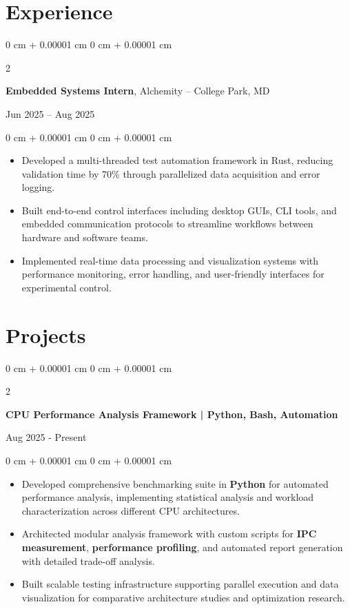 \documentclass[10pt, letterpaper]{article}
\newenvironment{highlights}{
    \begin{itemize}[
        topsep=0.05 cm,
        parsep=0.05 cm,
        partopsep=0pt,
        itemsep=0pt,
        leftmargin=0 cm + 10pt
    ]
}{
    \end{itemize}
}
\newenvironment{onecolentry}{
    \begin{adjustwidth}{
        0 cm + 0.00001 cm
    }{
        0 cm + 0.00001 cm
    }
}{
    \end{adjustwidth}
}
\newenvironment{twocolentry}[2][]{
    \onecolentry
    \def\secondColumn{#2}
    \setcolumnwidth{\fill, 4.5 cm}
    \begin{paracol}{2}
}{
    \switchcolumn \raggedleft \secondColumn
    \end{paracol}
    \endonecolentry
}
\begin{document}
    \section{Experience}

        \begin{twocolentry}{
            Jun 2025 – Aug 2025
        }
            \textbf{Embedded Systems Intern}, Alchemity -- College Park, MD
        \end{twocolentry}
        \vspace{0.05 cm}
        \begin{onecolentry}
            \begin{highlights}
                \item Developed a multi-threaded test automation framework in Rust, reducing validation time by 70\% through parallelized data acquisition and error logging.
                \item Built end-to-end control interfaces including desktop GUIs, CLI tools, and embedded communication protocols to streamline workflows between hardware and software teams.
                \item Implemented real-time data processing and visualization systems with performance monitoring, error handling, and user-friendly interfaces for experimental control.
            \end{highlights}
        \end{onecolentry}

    \section{Projects}

        \begin{twocolentry}{
            Aug 2025 - Present
        }
            \textbf{CPU Performance Analysis Framework | Python, Bash, Automation}
        \end{twocolentry}
        \vspace{0.05 cm}
        \begin{onecolentry}
            \begin{highlights}
                \item Developed comprehensive benchmarking suite in \textbf{Python} for automated performance analysis, implementing statistical analysis and workload characterization across different CPU architectures.
                \item Architected modular analysis framework with custom scripts for \textbf{IPC measurement}, \textbf{performance profiling}, and automated report generation with detailed trade-off analysis.
                \item Built scalable testing infrastructure supporting parallel execution and data visualization for comparative architecture studies and optimization research.
            \end{highlights}
        \end{onecolentry}
\end{document}
